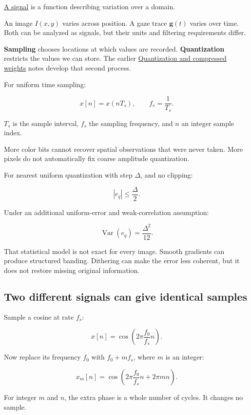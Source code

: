 \hyperref[appendix-1077ea8fc737]{A signal} is a function describing variation over a domain.

An image \(I(x,y)\) varies across position. A gaze trace \(\mathbf g(t)\) varies over time. Both can be analyzed as signals, but their units and filtering requirements differ.

\textbf{Sampling} chooses locations at which values are recorded. \textbf{Quantization} restricts the values we can store. The earlier \hyperref[appendix-fdc7879e8bf2]{Quantization and compressed weights} notes develop that second process.

For uniform time sampling:

\[
x[n]=x(nT_s),\qquad f_s=\frac1{T_s}.
\]

\(T_s\) is the sample interval, \(f_s\) the sampling frequency, and \(n\) an integer sample index.

More color bits cannot recover spatial observations that were never taken. More pixels do not automatically fix coarse amplitude quantization.

For nearest uniform quantization with step \(\Delta\), and no clipping:

\[
|e_q|\leq\frac{\Delta}{2}.
\]

Under an additional uniform-error and weak-correlation assumption:

\[
\operatorname{Var}(e_q)=\frac{\Delta^2}{12}.
\]

That statistical model is not exact for every image. Smooth gradients can produce structured banding. Dithering can make the error less coherent, but it does not restore missing original information.

\subsection{Two different signals can give identical samples}\label{04-visual-computing-ii-ch043-two-different-signals-can-give-identical-samples}

Sample a cosine at rate \(f_s\):

\[
x[n]=\cos\left(2\pi\frac{f_0}{f_s}n\right).
\]

Now replace its frequency \(f_0\) with \(f_0+mf_s\), where \(m\) is an integer:

\[
x_m[n]
=\cos\left(2\pi\frac{f_0}{f_s}n+2\pi mn\right).
\]

For integer \(m\) and \(n\), the extra phase is a whole number of cycles. It changes no sample.


